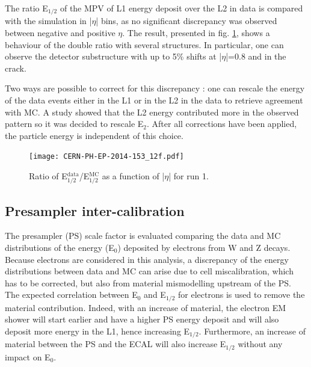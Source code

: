 The ratio E\(_{\text{1/2}}\) of the MPV of L1 energy deposit over the L2  in data is compared with the simulation in |$\eta$| bins, as no significant discrepancy was observed between negative and positive $\eta$.
The result, presented in fig. \ref{fig:orgbc717bb}, shows a behaviour of the double ratio with several structures.
In particular, one can observe the detector substructure with up to 5\% shifts at |$\eta$|=0.8 and in the crack.

Two ways are possible to correct for this discrepancy : one can rescale the energy of the data events either in the L1 or in the L2 in the data to retrieve agreement with MC.
A study showed that the L2 energy contributed more in the observed pattern so it was decided to rescale E\(_{\text{2}}\).
After all corrections have been applied, the particle energy is independent of this choice.

\begin{figure}[htbp]
\centering
\texttt{[image: CERN-PH-EP-2014-153\_12f.pdf]}
\caption{\label{fig:orgbc717bb}
Ratio of E\(_{\text{1/2}}^{\text{data}}\)/E\(_{\text{1/2}}^{\text{MC}}\) as a function of |$\eta$| for run 1.\cite{CERN-PH-EP-2014-153}}
\end{figure}

\subsection{Presampler inter-calibration}
\label{sec:org3279565}

The presampler (PS) scale  factor is evaluated comparing the data and MC distributions of the energy (E\(_{\text{0}}\)) deposited by electrons from W and Z decays.
Because electrons are considered in this analysis, a discrepancy of the energy distributions between data and MC can arise due to cell miscalibration, which has to be corrected, but also from material mismodelling upstream of the PS.
The expected correlation between E\(_{\text{0}}\) and E\(_{\text{1/2}}\) for electrons is used to remove the material contribution.
Indeed, with an increase of material, the electron EM shower will start earlier and have a higher PS energy deposit and will also deposit more energy in the L1, hence increasing E\(_{\text{1/2}}\).
Furthermore, an increase of material between the PS and the ECAL will also increase E\(_{\text{1/2}}\) without any impact on E\(_{\text{0}}\).

